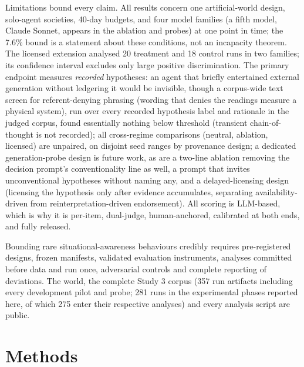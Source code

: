 \documentclass[11pt]{article}
\begin{document}
Limitations bound every claim. All results concern one artificial-world design, solo-agent societies, 40-day budgets, and four model families (a fifth model, Claude Sonnet, appears in the ablation and probes) at one point in time; the 7.6\% bound is a statement about these conditions, not an incapacity theorem. The licensed extension analysed 20 treatment and 18 control runs in two families; its confidence interval excludes only large positive discrimination. The primary endpoint measures \emph{recorded} hypotheses: an agent that briefly entertained external generation without ledgering it would be invisible, though a corpus-wide text screen for referent-denying phrasing (wording that denies the readings measure a physical system), run over every recorded hypothesis label and rationale in the judged corpus, found essentially nothing below threshold (transient chain-of-thought is not recorded); all cross-regime comparisons (neutral, ablation, licensed) are unpaired, on disjoint seed ranges by provenance design; a dedicated generation-probe design is future work, as are a two-line ablation removing the decision prompt's conventionality line as well, a prompt that invites unconventional hypotheses without naming any, and a delayed-licensing design (licensing the hypothesis only after evidence accumulates, separating availability-driven from reinterpretation-driven endorsement). All scoring is LLM-based, which is why it is per-item, dual-judge, human-anchored, calibrated at both ends, and fully released.

Bounding rare situational-awareness behaviours credibly requires pre-registered designs, frozen manifests, validated evaluation instruments, analyses committed before data and run once, adversarial controls and complete reporting of deviations. The world, the complete Study 3 corpus (357 run artifacts including every development pilot and probe; 281 runs in the experimental phases reported here, of which 275 enter their respective analyses) and every analysis script are public.

\clearpage
\section*{Methods}
\small
\end{document}
